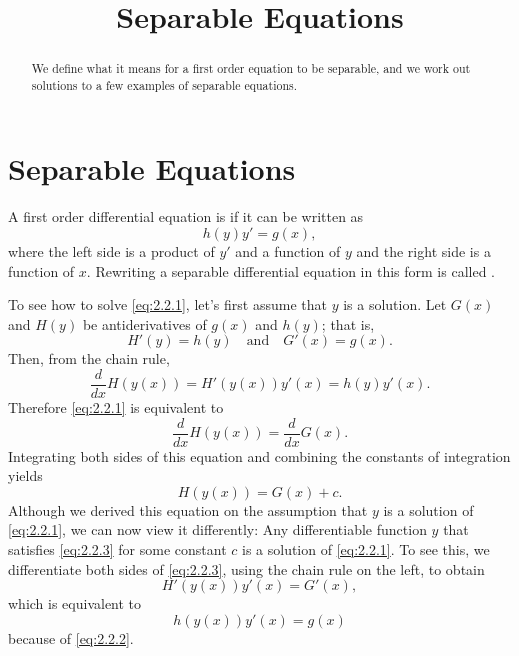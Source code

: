 \documentclass{ximera}
\title{Separable Equations}
\begin{document}

\begin{abstract}
We define what it means for a first order equation to be separable, and we work out solutions to a few examples of separable equations.
\end{abstract}

\maketitle

\section*{Separable Equations}


A first order differential equation  is   if it can be written as
\begin{equation} \label{eq:2.2.1}
h(y)y'=g(x),
\end{equation}
where the left side is a product of $y'$ and a function of $y$ and
the right side is a function of $x$. Rewriting a separable
differential equation in this form is called . 


To see how to solve \eqref{eq:2.2.1}, let's first assume that $y$
is a solution.
Let  $G(x)$ and $H(y)$ be antiderivatives of $g(x)$
and $h(y)$; that is,
\begin{equation} \label{eq:2.2.2}
H'(y)=h(y)\quad\text{and}\quad G'(x)=g(x).
\end{equation}
Then, from the chain rule,
$$
\frac{d}{dx}H(y(x))=H'(y(x))y'(x)=h(y)y'(x).
$$
Therefore \eqref{eq:2.2.1} is equivalent to
$$
\frac{d}{dx}H(y(x))=\frac{d}{dx}G(x).
$$
Integrating both sides of this equation and combining the constants of
integration yields
\begin{equation} \label{eq:2.2.3}
H(y(x))=G(x)+c.
\end{equation}
Although we derived this equation on the assumption that $y$
is a solution of \eqref{eq:2.2.1}, we can now view it differently:
Any differentiable function $y$ that satisfies \eqref{eq:2.2.3}
for some constant $c$ is a solution of \eqref{eq:2.2.1}. To see this, we
differentiate both sides of \eqref{eq:2.2.3}, using the chain rule on the
left, to obtain
$$
H'(y(x))y'(x)=G'(x),
$$
which is equivalent to
$$
h(y(x))y'(x)=g(x)
$$
because of \eqref{eq:2.2.2}.
\end{document}
